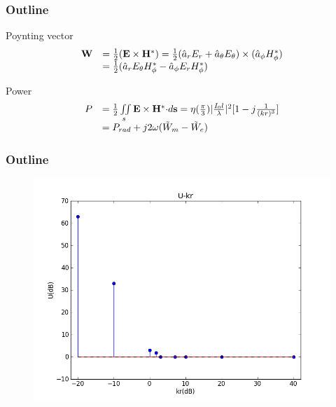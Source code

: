 \documentclass[compress=true]{beamer}
\begin{document}
\begin{frame}
	\frametitle{Outline}
\begin{block}{Poynting vector}
	$$
		\begin{array}{ll}
			{\bf W} & =\frac{1}{2}({\bf E}\times{\bf
			H}^*)=\frac{1}{2}(\hat{a}_rE_r+\hat{a}_{\theta}E_{\theta})\times(\hat{a}_{\phi}H_{\phi}^*)\\
		{}	&
			=\frac{1}{2}(\hat{a}_rE_{\theta}H_{\phi}^* - \hat{a}_{\phi}E_rH_{\phi}^*)
		\end{array}
	$$
\end{block}
\begin{block}{Power}
    $$
        \begin{array}{ll}
          P & =\frac{1}{2}\iint\limits_s {\bf E}\times{\bf H}^*{\cdot}d{\bf s}=\eta(\frac{\pi}{3})|\frac{I_0l}{\lambda}|^2[1-j\frac{1}{(kr)^3}]\\
          {}  & =P_{rad}+j2\omega({\tilde{W}_m-\tilde{W}_e})
          \end{array}
    $$
\end{block}
\end{frame}

\begin{frame}
  \frametitle{Outline}
 \begin{figure}
    \includegraphics[height=0.8\textheight]{ratio.png}
  \end{figure}
\end{frame}
\end{document}
